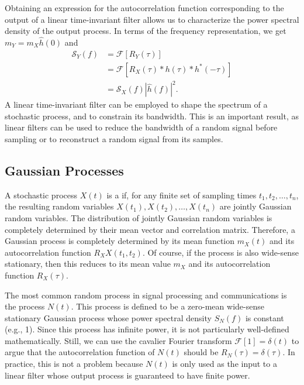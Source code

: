 Obtaining an expression for the autocorrelation function corresponding to the output of a linear time-invariant filter allows us to characterize the power spectral density of the output process.
In terms of the frequency representation, we get $m_Y = m_X \hat{h}(0)$ and
\begin{equation*}
\begin{split}
\mathcal{S}_Y (f) &= \mathcal{F} [ R_Y (\tau) ] \\
&= \mathcal{F} \left[ R_X (\tau) \ast h(\tau) \ast h^*(-\tau) \right] \\
&= \mathcal{S}_X(f) | \hat{h}(f) |^2 .
\end{split}
\end{equation*}
A linear time-invariant filter can be employed to shape the spectrum of a stochastic process, and to constrain its bandwidth.
This is an important result, as linear filters can be used to reduce the bandwidth of a random signal before sampling or to reconstruct a random signal from its samples.

\subsection{Gaussian Processes}

A stochastic process $X(t)$ is a  if, for any finite set of sampling times $t_1, t_2, \ldots, t_n$, the resulting random variables $X(t_1),X(t_2),\ldots,X(t_n)$ are jointly Gaussian random variables.
The distribution of jointly Gaussian random variables is completely determined by their mean vector and correlation matrix.
Therefore, a Gaussian process is completely determined by its mean function $m_X (t)$ and its autocorrelation function $R_XX (t_1,t_2)$.
Of course, if the process is also wide-sense stationary, then this reduces to its mean value $m_X$ and its autocorrelation function $R_X (\tau)$.

The most common random process in signal processing and communications is the  process $N(t)$.
This process is defined to be a zero-mean wide-sense stationary Gaussian process whose power spectral density $S_N (f)$ is constant (e.g., 1).
Since this process has infinite power, it is not particularly well-defined mathematically.
Still, we can use the cavalier Fourier transform $\mathcal{F} [ 1 ] = \delta(t)$ to argue that the autocorrelation function of $N(t)$ should be $R_N (\tau) = \delta(\tau)$.
In practice, this is not a problem because $N(t)$ is only used as the input to a linear filter whose output process is guaranteed to have finite power.

